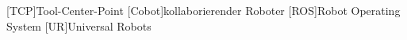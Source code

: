 \newpage
{} %
\tableofcontents{}
\newpage
{}

\begin{acronym}[Grundlagen]
[TCP]{Tool-Center-Point}
[Cobot]{kollaborierender Roboter}
[ROS]{Robot Operating System}
[UR]{Universal Robots}
\end{acronym}
\newpage
\listoffigures
